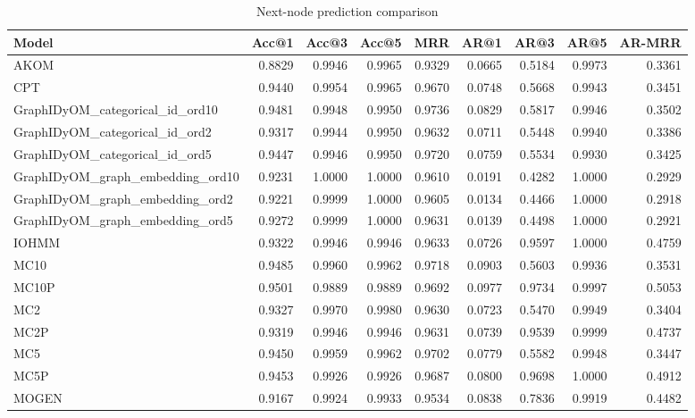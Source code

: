 \begin{table}
\caption{Next-node prediction comparison}
\label{tab:comparison}
\begin{tabular}{lrrrrrrrr}
\toprule
Model & Acc@1 & Acc@3 & Acc@5 & MRR & AR@1 & AR@3 & AR@5 & AR-MRR \\
\midrule
AKOM & 0.8829 & 0.9946 & 0.9965 & 0.9329 & 0.0665 & 0.5184 & 0.9973 & 0.3361 \\
CPT & 0.9440 & 0.9954 & 0.9965 & 0.9670 & 0.0748 & 0.5668 & 0.9943 & 0.3451 \\
GraphIDyOM_categorical_id_ord10 & 0.9481 & 0.9948 & 0.9950 & 0.9736 & 0.0829 & 0.5817 & 0.9946 & 0.3502 \\
GraphIDyOM_categorical_id_ord2 & 0.9317 & 0.9944 & 0.9950 & 0.9632 & 0.0711 & 0.5448 & 0.9940 & 0.3386 \\
GraphIDyOM_categorical_id_ord5 & 0.9447 & 0.9946 & 0.9950 & 0.9720 & 0.0759 & 0.5534 & 0.9930 & 0.3425 \\
GraphIDyOM_graph_embedding_ord10 & 0.9231 & 1.0000 & 1.0000 & 0.9610 & 0.0191 & 0.4282 & 1.0000 & 0.2929 \\
GraphIDyOM_graph_embedding_ord2 & 0.9221 & 0.9999 & 1.0000 & 0.9605 & 0.0134 & 0.4466 & 1.0000 & 0.2918 \\
GraphIDyOM_graph_embedding_ord5 & 0.9272 & 0.9999 & 1.0000 & 0.9631 & 0.0139 & 0.4498 & 1.0000 & 0.2921 \\
IOHMM & 0.9322 & 0.9946 & 0.9946 & 0.9633 & 0.0726 & 0.9597 & 1.0000 & 0.4759 \\
MC10 & 0.9485 & 0.9960 & 0.9962 & 0.9718 & 0.0903 & 0.5603 & 0.9936 & 0.3531 \\
MC10P & 0.9501 & 0.9889 & 0.9889 & 0.9692 & 0.0977 & 0.9734 & 0.9997 & 0.5053 \\
MC2 & 0.9327 & 0.9970 & 0.9980 & 0.9630 & 0.0723 & 0.5470 & 0.9949 & 0.3404 \\
MC2P & 0.9319 & 0.9946 & 0.9946 & 0.9631 & 0.0739 & 0.9539 & 0.9999 & 0.4737 \\
MC5 & 0.9450 & 0.9959 & 0.9962 & 0.9702 & 0.0779 & 0.5582 & 0.9948 & 0.3447 \\
MC5P & 0.9453 & 0.9926 & 0.9926 & 0.9687 & 0.0800 & 0.9698 & 1.0000 & 0.4912 \\
MOGEN & 0.9167 & 0.9924 & 0.9933 & 0.9534 & 0.0838 & 0.7836 & 0.9919 & 0.4482 \\
\bottomrule
\end{tabular}
\end{table}
